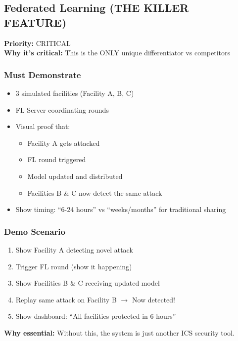 \documentclass[11pt,a4paper]{article}
\begin{document}
\subsection{Federated Learning (THE KILLER FEATURE)}

\textbf{Priority:} \textcolor{critical}{CRITICAL} \\
\textbf{Why it's critical:} This is the ONLY unique differentiator vs competitors

\subsubsection{Must Demonstrate}

\begin{itemize}[leftmargin=*]
    \item 3 simulated facilities (Facility A, B, C)
    \item FL Server coordinating rounds
    \item Visual proof that:
    \begin{itemize}
        \item Facility A gets attacked
        \item FL round triggered
        \item Model updated and distributed
        \item Facilities B \& C now detect the same attack
    \end{itemize}
    \item Show timing: ``6-24 hours'' vs ``weeks/months'' for traditional sharing
\end{itemize}


\subsubsection{Demo Scenario}

\begin{enumerate}[leftmargin=*]
    \item Show Facility A detecting novel attack
    \item Trigger FL round (show it happening)
    \item Show Facilities B \& C receiving updated model
    \item Replay same attack on Facility B $\rightarrow$ Now detected!
    \item Show dashboard: ``All facilities protected in 6 hours''
\end{enumerate}

\textbf{Why essential:} Without this, the system is just another ICS security tool.
\end{document}
